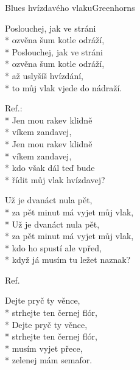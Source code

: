 \documentclass[10.5pt]{book}
\begin{document}
\begin{poem}{Blues hvízdavého vlaku}{Greenhorns}

\settowidth{\versewidth}{za pět minut má vyjet můj vlak,}

Poslouchej, jak ve stráni\\*
ozvěna šum kotle odráží,\\*
Poslouchej, jak ve stráni\\*
ozvěna šum kotle odráží,\\*
až uslyšíš hvízdání,\\*
to můj vlak vjede do nádraží.

Ref.:\\*
Jen mou rakev klidně\\*
víkem zandavej,\\*
Jen mou rakev klidně\\*
víkem zandavej,\\*
kdo však dál teď bude\\*
řídit můj vlak hvízdavej?

Už je dvanáct nula pět,\\*
za pět minut má vyjet můj vlak,\\*
Už je dvanáct nula pět,\\*
za pět minut má vyjet můj vlak,\\*
kdo ho spustí ale vpřed,\\*
když já musím tu ležet naznak?

Ref.

Dejte pryč ty věnce,\\*
strhejte ten černej flór,\\*
Dejte pryč ty věnce,\\*
strhejte ten černej flór,\\*
musím vyjet přece,\\*
zelenej mám semafor.

\end{poem}
\end{document}
